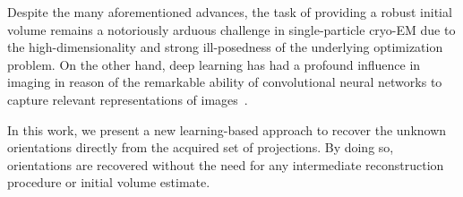 Despite the many aforementioned advances, the task of providing a robust initial volume remains a notoriously arduous challenge in single-particle cryo-EM due to the high-dimensionality and strong ill-posedness of the underlying optimization problem.
On the other hand, deep learning has had a profound influence in imaging in reason of the remarkable ability of convolutional neural networks to capture relevant representations of images~\cite{lecun2015deep}.

In this work, we present a new learning-based approach to recover the unknown orientations directly from the acquired set of projections.
By doing so, orientations are recovered without the need for any intermediate reconstruction procedure or initial volume estimate. %

